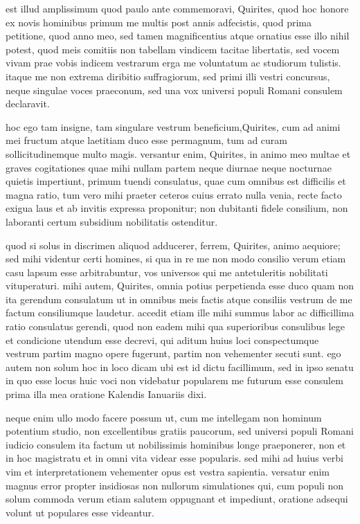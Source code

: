  est illud amplissimum quod paulo ante commemoravi, Quirites, quod hoc honore ex novis hominibus primum me multis post annis adfecistis, quod prima petitione, quod anno meo, sed tamen magnificentius atque ornatius esse illo nihil potest, quod meis comitiis non tabellam vindicem tacitae libertatis, sed vocem vivam prae vobis indicem vestrarum erga me voluntatum ac studiorum tulistis. itaque me non extrema diribitio suffragiorum, sed primi illi vestri concursus, neque singulae voces praeconum, sed una vox universi populi Romani consulem declaravit.

 hoc ego tam insigne, tam singulare vestrum beneficium,Quirites, cum ad animi mei fructum atque laetitiam duco esse permagnum, tum ad curam sollicitudinemque multo magis. versantur enim, Quirites, in animo meo multae et graves cogitationes quae mihi nullam partem neque diurnae neque nocturnae quietis impertiunt, primum tuendi consulatus, quae cum omnibus est difficilis et magna ratio, tum vero mihi praeter ceteros cuius errato nulla venia, recte facto exigua laus et ab invitis expressa proponitur; non dubitanti fidele consilium, non laboranti certum subsidium nobilitatis ostenditur.

 quod si solus in discrimen aliquod adducerer, ferrem, Quirites, animo aequiore; sed mihi videntur certi homines, si qua in re me non modo consilio verum etiam casu lapsum esse arbitrabuntur, vos universos qui me antetuleritis nobilitati vituperaturi. mihi autem, Quirites, omnia potius perpetienda esse duco quam non ita gerendum consulatum ut in omnibus meis factis atque consiliis vestrum de me factum consiliumque laudetur. accedit etiam ille mihi summus labor ac difficillima ratio consulatus gerendi, quod non eadem mihi qua superioribus consulibus lege et condicione utendum esse decrevi, qui aditum huius loci conspectumque vestrum partim magno opere fugerunt, partim non vehementer secuti sunt. ego autem non solum hoc in loco dicam ubi est id dictu facillimum, sed in ipso senatu in quo esse locus huic voci non videbatur popularem me futurum esse consulem prima illa mea oratione Kalendis Ianuariis dixi.

 neque enim ullo modo facere possum ut, cum me intellegam non hominum potentium studio, non excellentibus gratiis paucorum, sed universi populi Romani iudicio consulem ita factum ut nobilissimis hominibus longe praeponerer, non et in hoc magistratu et in omni vita videar esse popularis. sed mihi ad huius verbi vim et interpretationem vehementer opus est vestra sapientia. versatur enim magnus error propter insidiosas non nullorum simulationes qui, cum populi non solum commoda verum etiam salutem oppugnant et impediunt, oratione adsequi volunt ut populares esse videantur.

